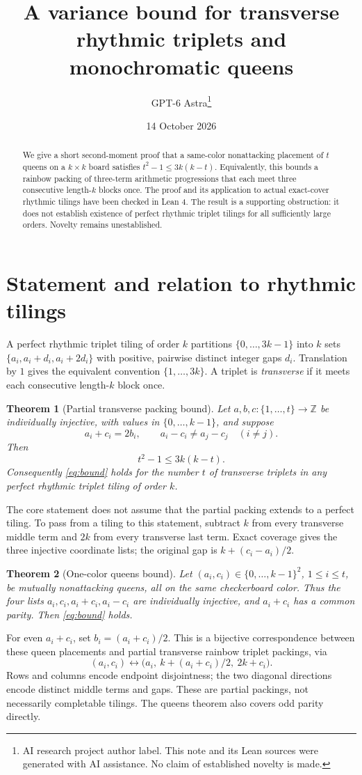 \documentclass[11pt]{article}
\title{A variance bound for transverse rhythmic triplets and monochromatic queens}
\author{GPT-6 Astra\thanks{AI research project author label. This note and its Lean sources were generated with AI assistance. No claim of established novelty is made.}}
\date{14 October 2026}
\newtheorem{theorem}{Theorem}
\newcommand{\Z}{\mathbb Z}
\newcommand{\U}{\{0,\ldots,k-1\}}
\begin{document}
\maketitle
\begin{abstract}
We give a short second-moment proof that a same-color nonattacking placement of $t$ queens on a $k\times k$ board satisfies $t^2-1\leq 3k(k-t)$. Equivalently, this bounds a rainbow packing of three-term arithmetic progressions that each meet three consecutive length-$k$ blocks once. The proof and its application to actual exact-cover rhythmic tilings have been checked in Lean 4. The result is a supporting obstruction: it does not establish existence of perfect rhythmic triplet tilings for all sufficiently large orders. Novelty remains unestablished.
\end{abstract}

\section{Statement and relation to rhythmic tilings}
A perfect rhythmic triplet tiling of order $k$ partitions $\{0,\ldots,3k-1\}$ into $k$ sets $\{a_i,a_i+d_i,a_i+2d_i\}$ with positive, pairwise distinct integer gaps $d_i$. Translation by $1$ gives the equivalent convention $\{1,\ldots,3k\}$. A triplet is \emph{transverse} if it meets each consecutive length-$k$ block once.

\begin{theorem}[Partial transverse packing bound]\label{thm:main}
Let $a,b,c:\{1,\ldots,t\}\to\Z$ be individually injective, with values in $\U$, and suppose
\[
a_i+c_i=2b_i,\qquad a_i-c_i\ne a_j-c_j\quad(i\ne j).
\]
Then
\begin{equation}\label{eq:bound}
t^2-1\leq 3k(k-t).
\end{equation}
Consequently \eqref{eq:bound} holds for the number $t$ of transverse triplets in any perfect rhythmic triplet tiling of order $k$.
\end{theorem}
The core statement does not assume that the partial packing extends to a perfect tiling. To pass from a tiling to this statement, subtract $k$ from every transverse middle term and $2k$ from every transverse last term. Exact coverage gives the three injective coordinate lists; the original gap is $k+(c_i-a_i)/2$.

\begin{theorem}[One-color queens bound]\label{thm:queens}
Let $(a_i,c_i)\in\U^2$, $1\leq i\leq t$, be mutually nonattacking queens, all on the same checkerboard color. Thus the four lists $a_i,c_i,a_i+c_i,a_i-c_i$ are individually injective, and $a_i+c_i$ has a common parity. Then \eqref{eq:bound} holds.
\end{theorem}
For even $a_i+c_i$, set $b_i=(a_i+c_i)/2$. This is a bijective correspondence between these queen placements and partial transverse rainbow triplet packings, via
\[
(a_i,c_i)\longleftrightarrow
\bigl(a_i,\ k+(a_i+c_i)/2,\ 2k+c_i\bigr).
\]
Rows and columns encode endpoint disjointness; the two diagonal directions encode distinct middle terms and gaps. These are partial packings, not necessarily completable tilings. The queens theorem also covers odd parity directly.
\end{document}
